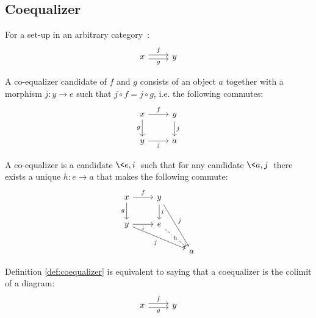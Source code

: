 \subsection{Coequalizer}

\begin{definition}
  For a set-up in an arbitrary
  category~\parencite[p.~128]{leinster:basic_category_theory}:
  \[\begin{tikzcd}[ampersand replacement=\&]
    x \& y
    \arrow["f", shift left=1, from=1-1, to=1-2]
    \arrow["g"', shift right=1, from=1-1, to=1-2]
  \end{tikzcd}\]

  A co-equalizer candidate of $f$ and $g$ consists of an object $a$ together
  with a morphism $j:y\to e$ such that $j\circ f = j\circ g$, i.e. the following
  commutes:
  \[\begin{tikzcd}[ampersand replacement=\&]
    x \& y \\
    y \& a
    \arrow["j"', from=2-1, to=2-2]
    \arrow["g"', from=1-1, to=2-1]
    \arrow["f", from=1-1, to=1-2]
    \arrow["j", from=1-2, to=2-2]
  \end{tikzcd}\]

  A co-equalizer is a candidate $\<e, i\>$ such that for any candidate $\<a,
  j\>$ there exists a unique $h: e\to a$ that makes the following commute:
  \[\begin{tikzcd}[ampersand replacement=\&]
    x \& y \\
    y \& e \\
    \&\& a
    \arrow["i", from=1-2, to=2-2]
    \arrow["i"', from=2-1, to=2-2]
    \arrow["g"', from=1-1, to=2-1]
    \arrow["f", from=1-1, to=1-2]
    \arrow["j"', from=2-1, to=3-3]
    \arrow["j", from=1-2, to=3-3]
    \arrow["h"{description}, dashed, from=2-2, to=3-3]
  \end{tikzcd}\]
\end{definition}

\begin{definition}
  Definition \ref{def:coequalizer} is equivalent to saying that a coequalizer is
  the colimit of a diagram:
  \[\begin{tikzcd}[ampersand replacement=\&]
    x \& y
    \arrow["f", shift left=1, from=1-1, to=1-2]
    \arrow["g"', shift right=1, from=1-1, to=1-2]
  \end{tikzcd}\]
\end{definition}